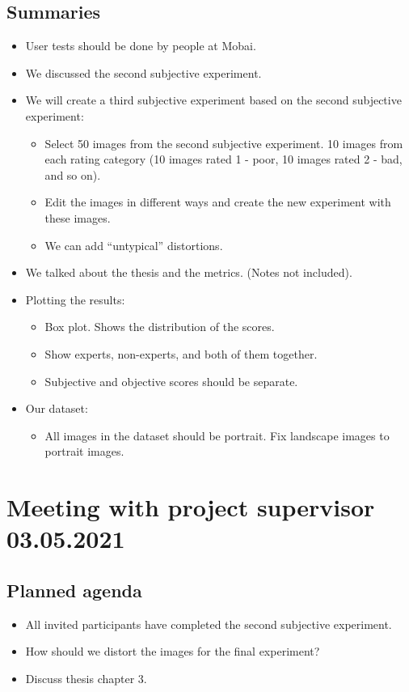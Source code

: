 \subsection*{Summaries}
\begin{itemize}
    \item User tests should be done by people at Mobai.
    \item We discussed the second subjective experiment. 
    \item We will create a third subjective experiment based on the second subjective experiment:
    \begin{itemize}
        \item Select 50 images from the second subjective experiment. 10 images from each rating category (10 images rated 1 - poor, 10 images rated 2 - bad, and so on).
        \item Edit the images in different ways and create the new experiment with these images.
        \item We can add “untypical” distortions.
    \end{itemize}
    \item We talked about the thesis and the metrics. (Notes not included).
    \item Plotting the results:
    \begin{itemize}
        \item Box plot. Shows the distribution of the scores.
        \item Show experts, non-experts, and both of them together.
        \item Subjective and objective scores should be separate.
    \end{itemize}
    \item Our dataset:
    \begin{itemize}
        \item All images in the dataset should be portrait. Fix landscape images to portrait images. 
    \end{itemize}
\end{itemize}



\section*{Meeting with project supervisor 03.05.2021}
\subsection*{Planned agenda}
\begin{itemize}
    \item All invited participants have completed the second subjective experiment.
    \item How should we distort the images for the final experiment?
    \item Discuss thesis chapter 3.
\end{itemize}


